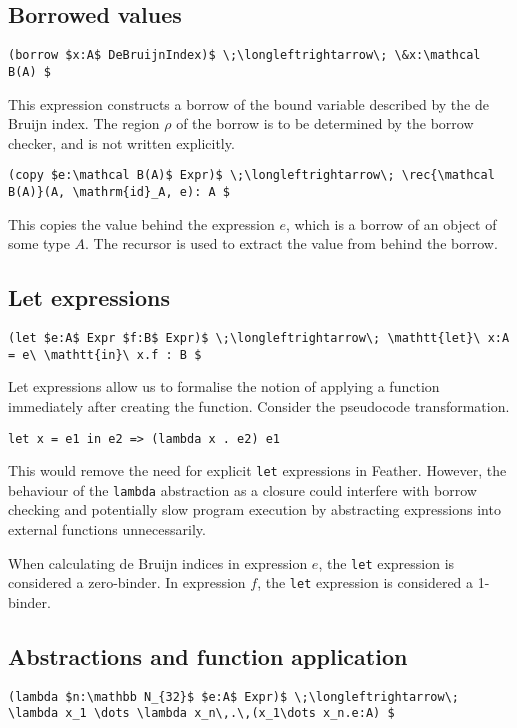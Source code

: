 \documentclass[11pt]{book}
\begin{document}
\subsection{Borrowed values}
\begin{lstlisting}[mathescape=true]
(borrow $x:A$ DeBruijnIndex)$ \;\longleftrightarrow\; \&x:\mathcal B(A) $
\end{lstlisting}
This expression constructs a borrow of the bound variable described by the de Bruijn index.
The region \( \rho \) of the borrow is to be determined by the borrow checker, and is not written explicitly.
\begin{lstlisting}[mathescape=true]
(copy $e:\mathcal B(A)$ Expr)$ \;\longleftrightarrow\; \rec{\mathcal B(A)}(A, \mathrm{id}_A, e): A $
\end{lstlisting}
This copies the value behind the expression \( e \), which is a borrow of an object of some type \( A \).
The recursor is used to extract the value from behind the borrow.

\subsection{Let expressions}
\begin{lstlisting}[mathescape=true]
(let $e:A$ Expr $f:B$ Expr)$ \;\longleftrightarrow\; \mathtt{let}\ x:A = e\ \mathtt{in}\ x.f : B $
\end{lstlisting}
Let expressions allow us to formalise the notion of applying a function immediately after creating the function.
Consider the pseudocode transformation.
\begin{lstlisting}
let x = e1 in e2 => (lambda x . e2) e1
\end{lstlisting}
This would remove the need for explicit \lstinline{let} expressions in Feather.
However, the behaviour of the \lstinline{lambda} abstraction as a closure could interfere with borrow checking and potentially slow program execution by abstracting expressions into external functions unnecessarily.

When calculating de Bruijn indices in expression \( e \), the \lstinline{let} expression is considered a zero-binder.
In expression \( f \), the \lstinline{let} expression is considered a 1-binder.

\subsection{Abstractions and function application}
\begin{lstlisting}[mathescape=true]
(lambda $n:\mathbb N_{32}$ $e:A$ Expr)$ \;\longleftrightarrow\; \lambda x_1 \dots \lambda x_n\,.\,(x_1\dots x_n.e:A) $
\end{lstlisting}
\end{document}
